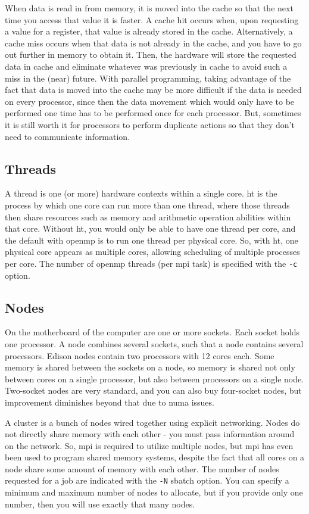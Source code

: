 \documentclass[10pt]{article}
\begin{document}
\begin{flushleft}
When data is read in from memory, it is moved into the cache so that the next time you access that value it is faster. A cache hit occurs when, upon requesting a value for a register, that value is already stored in the cache. Alternatively, a cache miss occurs when that data is not already in the cache, and you have to go out further in memory to obtain it. Then, the hardware will store the requested data in cache and eliminate whatever was previously in cache to avoid such a miss in the (near) future. With parallel programming, taking advantage of the fact that data is moved into the cache may be more difficult if the data is needed on every processor, since then the data movement which would only have to be performed one time has to be performed once for each processor. But, sometimes it is still worth it for processors to perform duplicate actions so that they don't need to communicate information.

\subsection{Threads}
A thread is one (or more) hardware contexts within a single core. \gls{ht} is the process by which one core can run more than one thread, where those threads then share resources such as memory and arithmetic operation abilities within that core. Without \gls{ht}, you would only be able to have one thread per core, and the default with \gls{openmp} is to run one thread per physical core. So, with \gls{ht}, one physical core appears as multiple cores, allowing scheduling of multiple processes per core. The number of \gls{openmp} threads (per \gls{mpi} task) is specified with the {\tt -c} option.

\subsection{Nodes}
On the motherboard of the computer are one or more sockets. Each socket holds one processor. A node combines several sockets, such that a node contains several processors. Edison nodes contain two processors with 12 cores each. Some memory is shared between the sockets on a node, so memory is shared not only between cores on a single processor, but also between processors on a single node. Two-socket nodes are very standard, and you can also buy four-socket nodes, but improvement diminishes beyond that due to \gls{numa} issues. 

A cluster is a bunch of nodes wired together using explicit networking. Nodes do not directly share memory with each other - you must pass information around on the network. So, \gls{mpi} is required to utilize multiple nodes, but \gls{mpi} has even been used to program shared memory systems, despite the fact that all cores on a node share some amount of memory with each other. The number of nodes requested for a job are indicated with the {\tt -N} sbatch option. You can specify a minimum and maximum number of nodes to allocate, but if you provide only one number, then you will use exactly that many nodes.


\end{flushleft}
\end{document}
